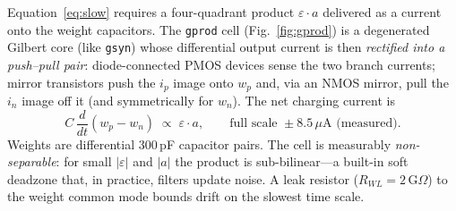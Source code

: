 \documentclass[11pt]{article}
\newcommand{\eps}{\varepsilon}
\begin{document}
Equation~\eqref{eq:slow} requires a four-quadrant product $\eps \cdot a$ delivered as a current onto the weight capacitors. The \texttt{gprod} cell (Fig.~\ref{fig:gprod}) is a degenerated Gilbert core (like \texttt{gsyn}) whose differential output current is then \emph{rectified into a push--pull pair}: diode-connected PMOS devices sense the two branch currents; mirror transistors push the $i_p$ image onto $w_p$ and, via an NMOS mirror, pull the $i_n$ image off it (and symmetrically for $w_n$). The net charging current is
\[
C\,\frac{d}{dt}(w_p - w_n) \;\propto\; \eps \cdot a, \qquad \text{full scale } \pm 8.5\,\mu\text{A (measured)} .
\]
Weights are differential 300\,pF capacitor pairs. The cell is measurably \emph{non-separable}: for small $|\eps|$ and $|a|$ the product is sub-bilinear---a built-in soft deadzone that, in practice, filters update noise. A leak resistor ($R_{WL}=2\,\mathrm{G}\Omega$) to the weight common mode bounds drift on the slowest time scale.
\end{document}
